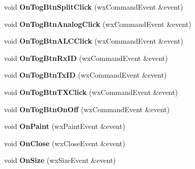 \begin{DoxyCompactItemize}
\item 
\hypertarget{class_main_frame_ad4c37f5ff0d7131df3450f8caab155d3}{void {\bfseries On\-Tog\-Btn\-Split\-Click} (wx\-Command\-Event \&event)}\label{class_main_frame_ad4c37f5ff0d7131df3450f8caab155d3}

\item 
\hypertarget{class_main_frame_af237b0cdbd857d4cc72f5a523457eb82}{void {\bfseries On\-Tog\-Btn\-Analog\-Click} (wx\-Command\-Event \&event)}\label{class_main_frame_af237b0cdbd857d4cc72f5a523457eb82}

\item 
\hypertarget{class_main_frame_ab1371babf6ebc9e24211a3ada34ab666}{void {\bfseries On\-Tog\-Btn\-A\-L\-C\-Click} (wx\-Command\-Event \&event)}\label{class_main_frame_ab1371babf6ebc9e24211a3ada34ab666}

\item 
\hypertarget{class_main_frame_a242e28aff7e479e59afccfaffb8b8e85}{void {\bfseries On\-Tog\-Btn\-Rx\-I\-D} (wx\-Command\-Event \&event)}\label{class_main_frame_a242e28aff7e479e59afccfaffb8b8e85}

\item 
\hypertarget{class_main_frame_a2bcfb5c59829cca3136f4bbc3989cf79}{void {\bfseries On\-Tog\-Btn\-Tx\-I\-D} (wx\-Command\-Event \&event)}\label{class_main_frame_a2bcfb5c59829cca3136f4bbc3989cf79}

\item 
\hypertarget{class_main_frame_a4bb33d30636a8cad4693412bc25337b7}{void {\bfseries On\-Tog\-Btn\-T\-X\-Click} (wx\-Command\-Event \&event)}\label{class_main_frame_a4bb33d30636a8cad4693412bc25337b7}

\item 
\hypertarget{class_main_frame_a7fc4afa20b92ac8e5f1ddfcf86820f28}{void {\bfseries On\-Tog\-Btn\-On\-Off} (wx\-Command\-Event \&event)}\label{class_main_frame_a7fc4afa20b92ac8e5f1ddfcf86820f28}

\item 
\hypertarget{class_main_frame_a2977ee86cf7f80eda32e6a900d47ab81}{void {\bfseries On\-Paint} (wx\-Paint\-Event \&event)}\label{class_main_frame_a2977ee86cf7f80eda32e6a900d47ab81}

\item 
\hypertarget{class_main_frame_a9f6f7f89d8b9aded1334cfa6eaca22bc}{void {\bfseries On\-Close} (wx\-Close\-Event \&event)}\label{class_main_frame_a9f6f7f89d8b9aded1334cfa6eaca22bc}

\item 
\hypertarget{class_main_frame_a8fd9580d3191784843f34269810a676b}{void {\bfseries On\-Size} (wx\-Size\-Event \&event)}\label{class_main_frame_a8fd9580d3191784843f34269810a676b}


\end{DoxyCompactItemize}
